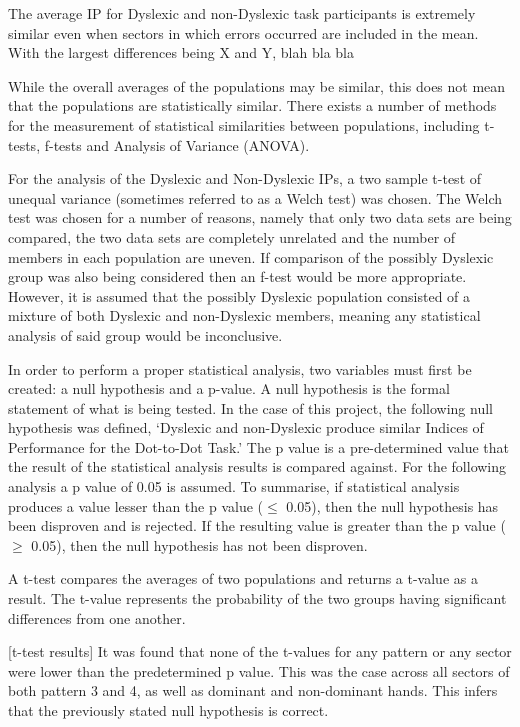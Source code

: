 		The average IP for Dyslexic and non-Dyslexic task participants is extremely similar even when sectors in which errors occurred are included in the mean. With the largest differences being X and Y, blah bla bla

		While the overall averages of the populations may be similar, this does not mean that the populations are statistically similar. There exists a number of methods for the measurement of statistical similarities between populations, including t-tests, f-tests and Analysis of Variance (ANOVA).

		For the analysis of the Dyslexic and Non-Dyslexic IPs, a two sample t-test of unequal variance (sometimes referred to as a Welch test)  was chosen. The Welch test was chosen for a number of reasons, namely that only two data sets are being compared, the two data sets are completely unrelated and the number of members in each population are uneven. If comparison of the possibly Dyslexic group was also being considered then an f-test would be more appropriate. However, it is assumed that the possibly Dyslexic population consisted of a mixture of both Dyslexic and non-Dyslexic members, meaning any statistical analysis of said group would be inconclusive.

		In order to perform a proper statistical analysis, two variables must first be created: a null hypothesis and a p-value. A null hypothesis is the formal statement of what is being tested. In the case of this project, the following null hypothesis was defined,
		‘Dyslexic and non-Dyslexic produce similar Indices of Performance for the Dot-to-Dot Task.’
		The p value is a pre-determined value that the result of the statistical analysis results is compared against. For the following analysis a p value of 0.05 is assumed. To summarise, if statistical analysis produces a value lesser than the p value ($\leq$ 0.05), then the null hypothesis has been disproven and is rejected. If the resulting value is greater than the p value ($\geq$ 0.05), then the null hypothesis has not been disproven.

		A t-test compares the averages of two populations and returns a t-value as a result. The t-value represents the probability of the two groups having significant differences from one  another. 

		[t-test results]
		It was found that none of the t-values for any pattern or any sector were lower than the predetermined p value. This was the case across all sectors of both pattern 3 and 4, as well as dominant and non-dominant hands. This infers that the previously stated null hypothesis is correct. 

